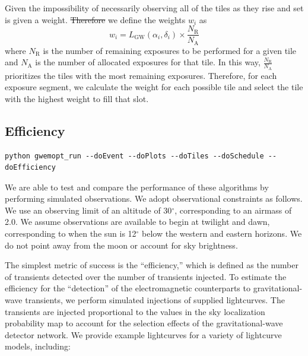 \documentclass[twocolumn]{aastex62}
\begin{document}
Given the impossibility of necessarily observing all of the tiles as they rise and set 
is given a weight. 
\sout{Therefore} we define the weights $w_i$ as
\begin{equation}
w_i = L_\textrm{GW}(\alpha_i,\delta_i) \times \frac{N_\textrm{R}}{N_\textrm{A}} 
\end{equation}
where $N_\textrm{R}$ is the number of remaining exposures to be performed for a given tile and $N_\textrm{A}$ is the number of allocated exposures for that tile.
In this way, $\frac{N_\textrm{R}}{N_\textrm{A}}$ prioritizes the tiles with the most remaining exposures.
Therefore, for each exposure segment, we calculate the weight for each possible tile and select the tile with the highest weight to fill that slot.
\subsection{Efficiency}
\label{subsection:efficiency}
\begin{lstlisting}
python gwemopt_run --doEvent --doPlots --doTiles --doSchedule --doEfficiency
\end{lstlisting}
We are able to test and compare the performance of these algorithms by performing simulated observations. 
We adopt observational constraints as follows. 
We use an observing limit of an altitude of 30$^\circ$, corresponding to an airmass of 2.0. 
We assume observations are available to begin at twilight and dawn, corresponding to when the sun is 12$^\circ$ below the western and eastern horizons.
We do not point away from the moon or account for sky brightness.

The simplest metric of success is the ``efficiency,'' which is defined as the number of transients detected over the number of transients injected.
To estimate the efficiency for the ``detection'' of the electromagnetic counterparts to gravitational-wave transients, we perform simulated injections of supplied lightcurves. 
The transients are injected proportional to the values in the sky localization probability map to account for the selection effects of the gravitational-wave detector network.
We provide example lightcurves for a variety of lightcurve models, including:
\end{document}
